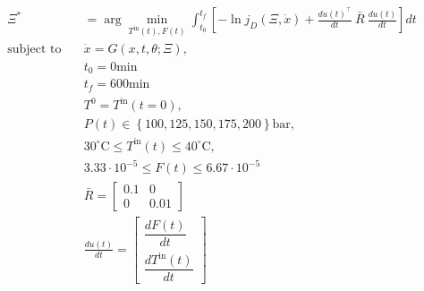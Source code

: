\documentclass[../Article_Design_of_Experiment.tex]{subfiles}
\begin{document}
	{\footnotesize 
		\begin{equation} 
			\begin{aligned} \Xi^* &= \arg \min_{ T^{\text{in}}(t), F(t) } \int_{t_0}^{t_f} \left[ - \ln j_D(\Xi, \dot{x}) + \frac{du(t)^\top}{dt}~\bar{R}~\frac{du(t)}{dt} \right] dt \\ 
				\text{subject to} \quad & \dot{x} = G(x, t, \theta; \Xi), \\ 
				& t_0 = 0 \text{min} \\ 
				& t_f = 600 \text{min} \\ 
				& T^{0} = T^{\text{in}}(t=0), \\ 
				& P(t) \in \left\{100, 125, 150, 175, 200\right\} \text{bar}, \\ 
				& 30^\circ\text{C} \leq T^{\text{in}}(t) \leq 40^\circ\text{C}, \\ 
				& 3.33 \cdot 10^{-5} \leq F(t) \leq 6.67 \cdot 10^{-5} \\
				& \bar{R} = \begin{bmatrix} 0.1 & 0 \\ 0 & 0.01 \end{bmatrix} \\ 
				& \frac{du(t)}{dt} = \begin{bmatrix} \dfrac{dF(t)}{dt} \\ \dfrac{dT^{\text{in}}(t)}{dt} \end{bmatrix}
				\end{aligned} 
				\label{EQ:Formulation_2} 
			\end{equation} }
	
\end{document}
